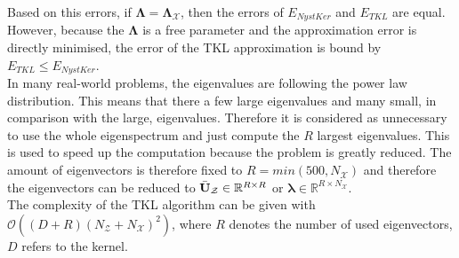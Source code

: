 Based on this errors, if $\boldsymbol{\Lambda} = \boldsymbol{\Lambda}_\mathcal{X}$, then the errors of $E_{NystKer}$ and $E_{TKL}$ are equal. 
However, because the $\boldsymbol{\Lambda}$ is a free parameter and the approximation error is directly minimised, the error of the \acs{TKL} approximation is bound by $E_{TKL}\le E_{NystKer}$.\cite{Long.}\\
In many real-world problems, the eigenvalues are following the power law distribution.
This means that there a few large eigenvalues and many small, in comparison with the large, eigenvalues.\cite{Mihail.2002}
Therefore it is considered as unnecessary to use the whole eigenspectrum and just compute the $R$ largest eigenvalues.
This is used to speed up the computation because the problem is greatly reduced.
The amount of eigenvectors is therefore fixed to $R=min(500,N_\mathcal{X})$ and therefore the eigenvectors can be reduced to $\bar{\mathbf{U}}_\mathcal{Z} \in \mathbb{R}^{R\times R}$ or $\mathbf{\lambda} \in \mathbb{R}^{R\times N_\mathcal{X}}$.\cite{Long.}\\
The complexity of the \acs{TKL} algorithm can be given with $\mathcal{O}((D+R)(N_\mathcal{Z}+N_\mathcal{X})^2)$, where $R$ denotes the number of used eigenvectors, $D$ refers to the kernel.\cite{Long.}

